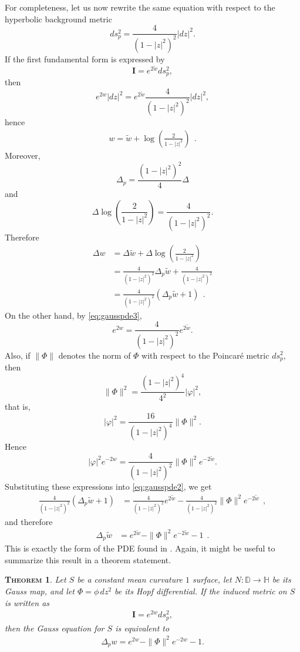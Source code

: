\documentclass[a4paper,11pt,openright,twoside]{book}
\newcommand{\I}{\mathbf{I}}
\newcommand{\1}{\mathds{1}}
\theoremstyle{plain}
\newtheorem{thm}{\textsc{Theorem}}[chapter]
\theoremstyle{definition}
\theoremstyle{remark}
\begin{document}
For completeness, let us now rewrite the same equation with respect to the hyperbolic background metric
\[
ds_p^2=\frac{4}{(1-|z|^2)^2}|dz|^2.
\]
If the first fundamental form is expressed by
\[
\I=e^{2\tilde w}ds_p^2,
\]
then
\[
e^{2w}|dz|^2=e^{2\tilde w}\frac{4}{(1-|z|^2)^2}|dz|^2,
\]
hence
\begin{align}\label{eq:gausspde3}
	w=\tilde w+\log\left(\frac{2}{1-|z|^2}\right)
\ \ .
\end{align}
Moreover,
\[
\Delta_p=\frac{(1-|z|^2)^2}{4}\Delta
\]
and
\[
\Delta \log\left(\frac{2}{1-|z|^2}\right)=\frac{4}{(1-|z|^2)^2}.
\]
Therefore
\begin{align*}
	\Delta w
	&=
	\Delta \tilde w
	+
	\Delta \log\left(\frac{2}{1-|z|^2}\right)\\
	&=
	\frac{4}{(1-|z|^2)^2}\Delta_p\tilde w
	+
	\frac{4}{(1-|z|^2)^2}\\
	&=
	\frac{4}{(1-|z|^2)^2}\left(\Delta_p\tilde w+1\right)
\ \ .
\end{align*}
On the other hand, by \eqref{eq:gausspde3},
\[
e^{2w}=\frac{4}{(1-|z|^2)^2}e^{2\tilde w}.
\]
Also, if $\|\Phi\|$ denotes the norm of $\Phi$ with respect to the Poincaré metric $ds_p^2$, then
\[
\|\Phi\|^2=\frac{(1-|z|^2)^4}{4^2}|\varphi|^2,
\]
that is,
\[
|\varphi|^2=\frac{16}{(1-|z|^2)^4}\|\Phi\|^2.
\]
Hence
\[
|\varphi|^2e^{-2w}
=
\frac{4}{(1-|z|^2)^2}\|\Phi\|^2e^{-2\tilde w}.
\]
Substituting these expressions into \eqref{eq:gausspde2}, we get
\begin{align*}
	\frac{4}{(1-|z|^2)^2}\left(\Delta_p\tilde w+1\right)
	&=
	\frac{4}{(1-|z|^2)^2}e^{2\tilde w}
	-
	\frac{4}{(1-|z|^2)^2}\|\Phi\|^2e^{-2\tilde w}
\ \ ,
\end{align*}
and therefore
\begin{align}\label{eq:gausspde4}
	\Delta_p\tilde w
	&=
	e^{2\tilde w}
	-
	\|\Phi\|^2e^{-2\tilde w}
	-
	1
\ \ .
\end{align}
This is exactly the form of the PDE found in \cite{Wan1992}. Again, it might be useful to summarize this result in a theorem statement.
\begin{thm}\label{thm:gausseqnthm}
	Let $S$ be a constant mean curvature $1$ surface, let $N:\mathbb{D}\to\mathbb{H}$ be its Gauss map, and let $\Phi=\phi\,dz^2$ be its Hopf differential. If the induced metric on $S$ is written as
	\begin{align*}
		\I=e^{2w}ds_{p}^2,
	\end{align*}
	then the Gauss equation for $S$ is equivalent to
	\begin{align*}
		\Delta_{p}w=e^{2w}-\|\Phi\|^2e^{-2w}-1.
	\end{align*}
\end{thm}
\end{document}
